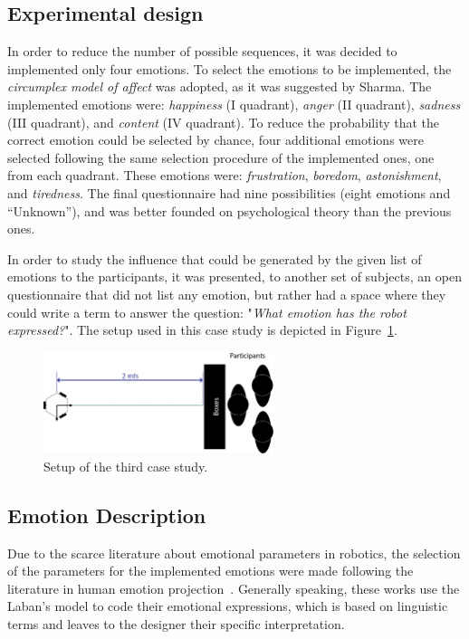 \subsection{Experimental design}

In order to reduce the number of possible sequences, it was decided to implemented only four emotions. To select the emotions to be implemented, the \textit{circumplex model of affect} was adopted, as it was suggested by Sharma. The implemented emotions were: \textit{happiness} (I quadrant), \textit{anger} (II quadrant), \textit{sadness} (III quadrant), and \textit{content} (IV quadrant). To reduce the probability that the correct emotion could be selected by chance, four additional emotions were selected following the same selection procedure of the implemented ones, one from each quadrant. These emotions were: \textit{frustration}, \textit{boredom}, \textit{astonishment}, and \textit{tiredness}. The final questionnaire had nine possibilities (eight emotions and ``Unknown''), and was better founded on psychological theory than the previous ones. 

In order to study the influence that could be generated by the given list of emotions to the participants, it was presented, to another set of subjects, an open questionnaire that did not list any emotion, but rather had a space where they could write a term to answer the question: "\textit{What emotion has the robot expressed?}".
The setup used in this case study is depicted in Figure~\ref{fig:setup2}.

\begin{figure}[h]
	\centering
	\includegraphics[width=0.6\textwidth]{./Images/ThirdCase.png} 
	\caption{Setup of the third case study.}
	\label{fig:setup2} 
\end{figure}

\subsection{Emotion Description} 

Due to the scarce literature about emotional parameters in robotics, the selection of the parameters for the implemented emotions were made following the literature in human emotion projection~\cite{Nadia2013, Crane2013}.
Generally speaking, these works use the Laban's model to code their emotional expressions, which is based on linguistic terms and leaves to the designer their specific interpretation.

